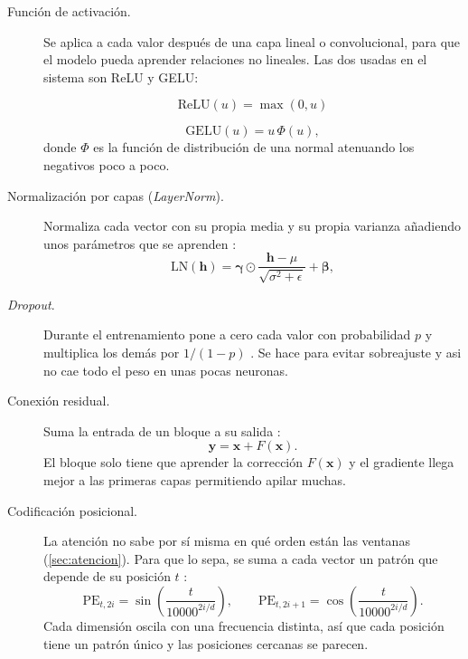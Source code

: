 \begin{description}
  \item[Función de activación.] Se aplica a cada valor después de una capa lineal o convolucional, para que el modelo pueda aprender relaciones no lineales. Las dos usadas en el sistema son ReLU y GELU\cite{hendrycks2016gelu}:

  \begin{equation}
    \mathrm{ReLU}(u) = \max(0, u)
  \end{equation}

  \begin{equation}
    \mathrm{GELU}(u) = u\,\Phi(u),
    \label{eq:gelu}
  \end{equation}
  donde $\Phi$ es la función de distribución de una normal atenuando los negativos poco a poco.

  \item[Normalización por capas (\textit{LayerNorm}).] Normaliza cada vector con su propia media y su propia varianza añadiendo unos parámetros que se aprenden \cite{ba2016layernorm}:
  \begin{equation}
    \mathrm{LN}(\mathbf{h}) = \boldsymbol{\gamma} \odot \frac{\mathbf{h} - \mu}{\sqrt{\sigma^2 + \epsilon}} + \boldsymbol{\beta},
    \label{eq:layernorm}
  \end{equation}

  \item[\textit{Dropout}.] Durante el entrenamiento pone a cero cada valor con probabilidad $p$ y multiplica los demás por $1/(1-p)$ \cite{srivastava2014dropout}. Se hace para evitar sobreajuste y asi no cae todo el peso en unas pocas neuronas.

  \item[Conexión residual.] Suma la entrada de un bloque a su salida \cite{he2016resnet}:
  \begin{equation}
    \mathbf{y} = \mathbf{x} + F(\mathbf{x}).
    \label{eq:residual}
  \end{equation}
  El bloque solo tiene que aprender la corrección $F(\mathbf{x})$ y el gradiente llega mejor a las primeras capas permitiendo apilar muchas.

  \item[Codificación posicional.] La atención no sabe por sí misma en qué orden están las ventanas (\cref{sec:atencion}). Para que lo sepa, se suma a cada vector un patrón que depende de su posición $t$ \cite{vaswani2017attention}:
  \begin{equation}
    \mathrm{PE}_{t,2i} = \sin\!\left( \frac{t}{10000^{2i/d}} \right), \qquad \mathrm{PE}_{t,2i+1} = \cos\!\left( \frac{t}{10000^{2i/d}} \right).
    \label{eq:posicional}
  \end{equation}
  Cada dimensión oscila con una frecuencia distinta, así que cada posición tiene un patrón único y las posiciones cercanas se parecen.
\end{description}

